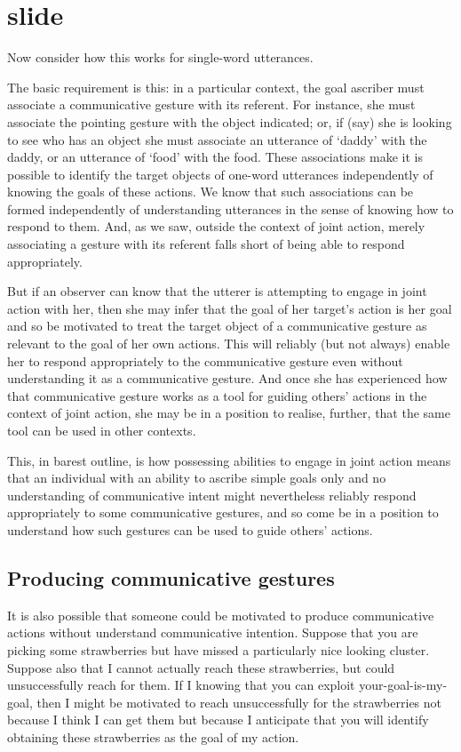 \documentclass[12pt,\papersize]{extarticle}
\begin{document}
\section{slide}
Now consider how this works for single-word utterances.

The basic requirement is this: in a particular context, the goal ascriber must associate a communicative gesture with its referent.
For instance, she must associate the pointing gesture with the object indicated; or, if (say) she is looking to see who has an object she must associate an utterance of `daddy' with the daddy,
or an utterance of `food' with the food.
These associations make it is possible to identify the target objects of one-word utterances independently of knowing the goals of these actions.
We know that such associations can be formed independently of understanding utterances in the sense of knowing how to respond to them.
And, as we saw, 
outside the context of joint action,
merely associating a gesture with its referent falls short of being able to respond appropriately.

But if an observer can know that the utterer is attempting to engage in joint action with her,
then she may infer that the goal of her target's action is her goal
and so be motivated to treat the target object of a communicative gesture as relevant to the goal of her own actions.
This will reliably (but not always) enable her to respond appropriately to the communicative gesture even without understanding it as a communicative gesture.
And once she has experienced how that communicative gesture works as a tool for guiding others' actions in the context of joint action,
she may be in a position to realise, further, that the same tool can be used in other contexts.

This, in barest outline, is 
how
possessing abilities to engage in joint action
means that 
an individual with an ability to ascribe simple goals only and no understanding of communicative intent
might 
nevertheless reliably respond appropriately to some communicative gestures,
and so come be in a position to understand how such gestures can be used to guide others' actions.


\subsection{Producing communicative gestures}
It is also possible that someone could be motivated to produce communicative actions without understand communicative intention.
Suppose that you are picking some strawberries but have missed a particularly nice looking cluster.
Suppose also that I cannot actually reach these strawberries, but could unsuccessfully reach for them. 
If I knowing that you can exploit your-goal-is-my-goal,
then I might be motivated to reach unsuccessfully for the strawberries not because I think I can get them but because I anticipate that you will identify obtaining these strawberries as the goal of my action.
\end{document}

